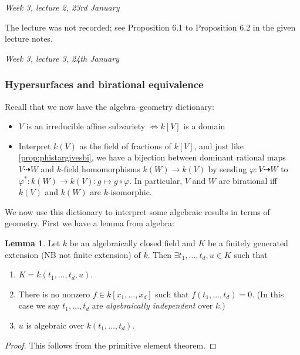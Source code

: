 \documentclass{article}
\theoremstyle{definition}
\newtheorem{lemma}[defn]{Lemma}
\begin{document}
\begin{flushright}
\textit{Week 3, lecture 2, 23rd January}
\end{flushright}

The lecture was not recorded; see Proposition 6.1 to Proposition 6.2 in the given lecture notes.

\begin{flushright}
\textit{Week 3, lecture 3, 24th January}
\end{flushright}

\subsubsection{Hypersurfaces and birational equivalence}
Recall that we now have the algebra--geometry dictionary:
\begin{itemize}
\item $V$ is an irreducible affine subvariety $\iff k[V]$ is a domain
\item Interpret $k(V)$ as the field of fractions of $k[V]$, and just like \ref{prop:phistargivesbi}, we have a bijection between dominant rational maps $V\dashrightarrow W$ and $k$-field homomorphisms $k(W)\rightarrow k(V)$ by sending $\varphi:V\dashrightarrow W$ to $\varphi^\ast:k(W)\rightarrow k(V):g\mapsto g\circ\varphi$. In particular, $V$ and $W$ are birational iff $k(V)$ and $k(W)$ are $k$-isomorphic.
\end{itemize}
We now use this dictionary to interpret some algebraic results in terms of geometry. First we have a lemma from algebra:

\begin{lemma}
Let $k$ be an algebraically closed field and $K$ be a finitely generated extension (NB not finite extension) of $k$. Then $\exists t_1,\ldots,t_d,u\in K$ such that
\begin{enumerate}
\item $K=k(t_1,\ldots,t_d,u)$.
\item There is no nonzero $f\in k[x_1,\ldots,x_d]$ such that $f(t_1,\ldots,t_d)=0$. (In this case we say $t_1,\ldots,t_d$ are \textit{algebraically independent} over $k$.)
\item $u$ is algebraic over $k(t_1,\ldots,t_d)$.
\end{enumerate}
\end{lemma}
\begin{proof}
This follows from the primitive element theorem.
\end{proof}
\end{document}
